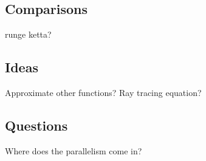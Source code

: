 \documentclass[10pt]{article}
\newcommand{\1}{\textbf{1}}
\theoremstyle{remark}
\theoremstyle{definition}
\begin{document}
\subsection{Comparisons}

runge ketta?

\subsection{Ideas}

Approximate other functions? Ray tracing equation?

\subsection{Questions}

Where does the parallelism come in?

\begin{thebibliography}{9}



\end{thebibliography}
\end{document}
